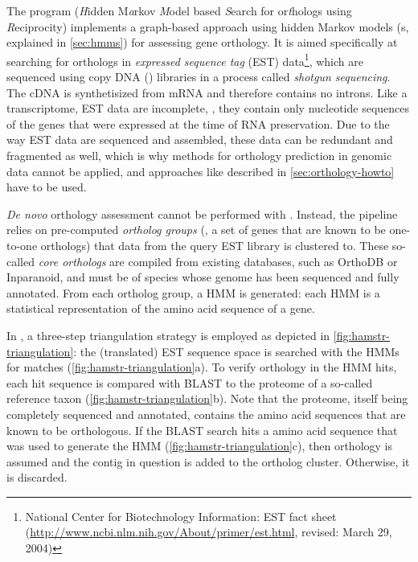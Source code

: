 \label{sec:hamstr}
The program \hamstr (\emph{H}idden M\emph{a}rkov \emph{M}odel based
\emph{S}earch for or\emph{t}hologs using \emph{R}eciprocity) implements a
graph-based approach using hidden Markov models (s, explained in \autoref{sec:hmms}) for assessing gene orthology.
It is aimed specifically at searching for orthologs in \emph{expressed sequence
tag} (EST) data\footnote{National Center
for Biotechnology Information: EST fact sheet
(\url{http://www.ncbi.nlm.nih.gov/About/primer/est.html}, revised: March 29,
2004)}, which are sequenced using copy DNA ()
libraries in a process called \emph{shotgun sequencing}. The cDNA is
synthetisized from mRNA and therefore contains no introns. Like a transcriptome,
EST data are incomplete, \ie, they contain only nucleotide sequences of the
genes that were expressed at the time of RNA preservation. Due to the way EST
data are sequenced and assembled, these data can be redundant and fragmented as
well, which is why methods for orthology prediction in genomic data cannot be
applied, and approaches like described in \autoref{sec:orthology-howto} have to
be used.

\emph{De novo} orthology assessment cannot be performed with \hamstr. Instead,
the pipeline relies on pre-computed \emph{ortholog groups}
(, a set of genes
that are known to be one-to-one orthologs) that data from the query EST library
is clustered to. These so-called \emph{core orthologs} are compiled from
existing databases, such as OrthoDB or Inparanoid, and must be of species 
whose genome has been sequenced and fully annotated.
From each ortholog group, a HMM is generated: each HMM is a statistical
representation of the amino acid sequence of a gene. 

In \hamstr, a three-step triangulation strategy is employed as depicted in
\autoref{fig:hamstr-triangulation}: the (translated) EST sequence space is
searched with the HMMs for matches (\autoref{fig:hamstr-triangulation}a). To
verify orthology in the HMM hits, each hit sequence is compared with BLAST
\citep{altschul1997} to the proteome of a so-called reference taxon
(\autoref{fig:hamstr-triangulation}b). Note that the proteome, itself being
completely sequenced and annotated, contains the amino acid sequences that are
known to be orthologous. If the BLAST search hits a amino acid sequence that was
used to generate the HMM (\autoref{fig:hamstr-triangulation}c), then orthology
is assumed and the contig in question is added to the ortholog cluster.
Otherwise, it is discarded.

